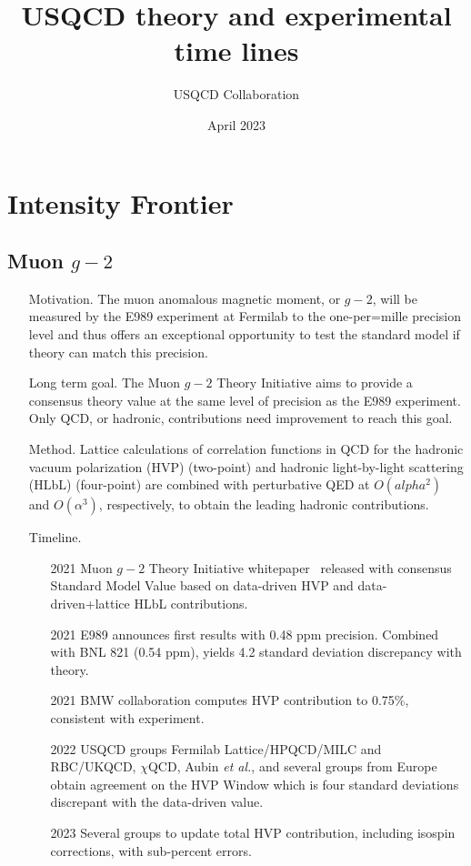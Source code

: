 \documentclass{article}
\title{USQCD theory and experimental time lines}
\author{USQCD Collaboration}
\date{April 2023}
\begin{document}
\maketitle
\tableofcontents
\section{Intensity Frontier}\label{sec:intensity}

\subsection{Muon $g-2$}
\begin{itemize}
    \item[Motivation.] The muon anomalous magnetic moment, or $g-2$, will be measured by the E989 experiment at Fermilab to the one-per=mille precision level and thus offers an exceptional opportunity to test the standard model if theory can match this precision.
    \item[Long term goal.] The Muon $g-2$ Theory Initiative aims to provide a consensus theory value at the same level of precision as the E989 experiment. Only QCD, or hadronic, contributions need improvement to reach this goal.
\item[Method.] Lattice  calculations of correlation functions in QCD for the hadronic vacuum polarization (HVP) (two-point) and hadronic light-by-light scattering (HLbL) (four-point) are combined with perturbative QED at $O(alpha^2)$ and $O(\alpha^3)$, respectively, to obtain the leading hadronic contributions.
\item[Timeline.]
\begin{itemize}
    \item[2021] Muon $g-2$ Theory Initiative whitepaper~\cite{Aoyama:2020ynm} released with consensus Standard Model Value based on data-driven HVP and data-driven+lattice HLbL contributions.
    \item[2021] E989 announces first results with 0.48 ppm precision. Combined with BNL 821 (0.54 ppm), yields 4.2 standard deviation discrepancy with theory.
    \item[2021] BMW collaboration computes HVP contribution to 0.75\%, consistent with experiment. 
    \item[2022] USQCD groups Fermilab Lattice/HPQCD/MILC and RBC/UKQCD, $\chi$QCD, Aubin {\it et al.}, and several groups from Europe obtain agreement on the HVP Window which is four standard deviations discrepant with the data-driven value.
    \item[2023] Several groups to update total HVP contribution, including isospin corrections, with sub-percent errors.

\end{itemize}
\end{itemize}
\end{document}
